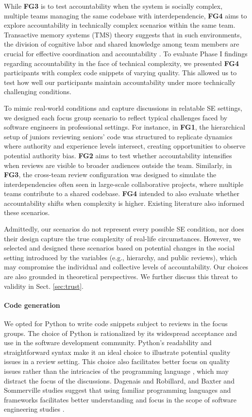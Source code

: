 While \textbf{FG3} is to test accountability when the system is socially complex, multiple teams managing the same codebase with interdependencie, \textbf{FG4} aims to explore accountability in technically complex scenarios within the same team. Transactive memory systems (TMS) theory suggests that in such environments, the division of cognitive labor and shared knowledge among team members are crucial for effective coordination and accountability \citep{wegner1987transactive}. To evaluate Phase I findings regarding accountability in the face of technical complexity, we presented \textbf{FG4} participants with complex code snippets of varying quality. This allowed us to test how well our participants maintain accountability under more technically challenging conditions.

To mimic real-world conditions and capture discussions in relatable SE settings, we designed each focus group scenario to reflect typical challenges faced by software engineers in professional settings. For instance, in \textbf{FG1}, the hierarchical setup of juniors reviewing seniors' code was structured to replicate dynamics where authority and experience levels intersect, creating opportunities to observe potential authority bias. \textbf{FG2} aims to test whether accountability intensifies when reviews are visible to broader audiences outside the team. Similarly, in \textbf{FG3}, the cross-team review configuration was designed to simulate the interdependencies often seen in large-scale collaborative projects, where multiple teams contribute to a shared codebase. \textbf{FG4} intended to also evaluate whether accountability shifts when complexity is higher. Existing literature also informed these scenarios.

Admittedly, our scenarios do not represent every possible SE condition, nor does their design capture the true complexity of real-life circumstances. However, we selected and designed these scenarios based on potential changes in the social setting introduced by the variables (e.g., hierarchy, and public reviews), which may compromise the individual and collective levels of accountability. Our choices are also grounded in theoretical perspectives. We further discuss this threat to validity in Sect. \ref{sec:trust}.

\paragraph*{Code generation} We opted for Python to write code snippets subject to reviews in the focus groups. The choice of Python is rationalized by its widespread acceptance and use in the software development community. Python's readability and straightforward \citep{van1995python} syntax make it an ideal choice to illustrate potential quality issues in a review setting. This choice also facilitates better focus on quality issues rather than the intricacies of the programming language \citep{dagenais2011recommending}, which may distract the focus of the discussions. Dagenais and Robillard, and Baxter and Sommerville studies suggest that using familiar programming languages and frameworks facilitates better understanding and focus in the scope of software engineering studies \citep{dagenais2011recommending,baxter2011socio}.

